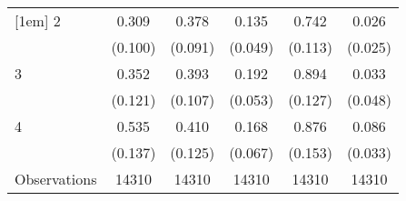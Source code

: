 {\begin{tabular}{l*{5}{c}}
[1em]
2                   &       0.309\sym{**} &       0.378\sym{***}&       0.135\sym{**} &       0.742\sym{***}&       0.026         \\
                    &     (0.100)         &     (0.091)         &     (0.049)         &     (0.113)         &     (0.025)         \\
[1em]
3                   &       0.352\sym{**} &       0.393\sym{***}&       0.192\sym{***}&       0.894\sym{***}&       0.033         \\
                    &     (0.121)         &     (0.107)         &     (0.053)         &     (0.127)         &     (0.048)         \\
[1em]
4                   &       0.535\sym{***}&       0.410\sym{**} &       0.168\sym{*}  &       0.876\sym{***}&       0.086\sym{**} \\
                    &     (0.137)         &     (0.125)         &     (0.067)         &     (0.153)         &     (0.033)         \\
\hline
Observations        &       14310         &       14310         &       14310         &       14310         &       14310         \\
\hline\hline
\end{tabular}
}
